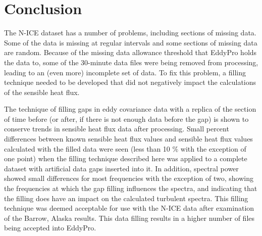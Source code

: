  \section{Conclusion}
The N-ICE dataset has a number of problems, including sections of missing data. Some of the data is missing at regular intervals and some sections of missing data are random. Because of the missing data allowance threshold that EddyPro holds the data to, some of the 30-minute data files were being removed from processing, leading to an (even more) incomplete set of data. To fix this problem, a filling technique needed to be developed that did not negatively impact the calculations of the sensible heat flux.

The technique of filling gaps in eddy covariance data with a replica of the section of time before (or after, if there is not enough data before the gap) is shown to conserve trends in sensible heat flux data after processing. Small percent differences between known sensible heat flux values and sensible heat flux values calculated with the filled data were seen (less than 10 $\%$ with the exception of one point) when the filling technique described here was applied to a complete dataset with artificial data gaps inserted into it. In addition, spectral power showed small differences for most frequencies with the exception of two, showing the frequencies at which the gap filling influences the spectra, and indicating that the filling does have an impact on the calculated turbulent spectra. This filling technique was deemed acceptable for use with the N-ICE data after examination of the Barrow, Alaska results. This data filling results in a higher number of files being accepted into EddyPro.

